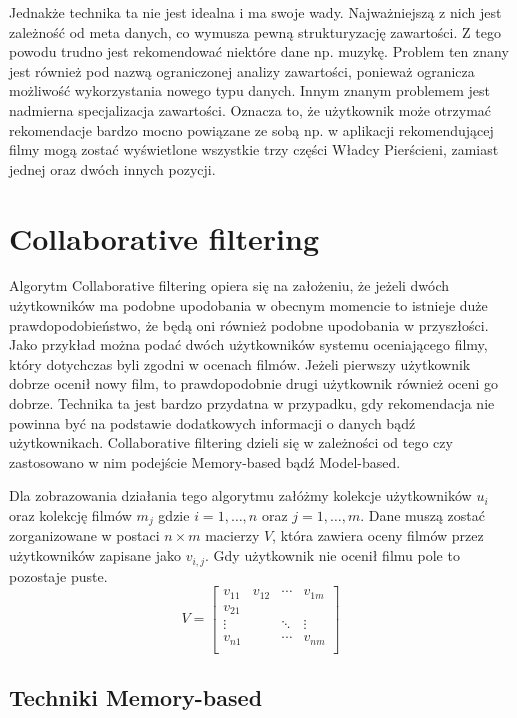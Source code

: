 Jednakże technika ta nie jest idealna i ma swoje wady. Najważniejszą z nich jest zależność od meta danych, co wymusza pewną strukturyzację zawartości. Z tego powodu trudno jest rekomendować niektóre dane np. muzykę. Problem ten znany jest również pod nazwą ograniczonej analizy zawartości, ponieważ ogranicza możliwość wykorzystania nowego typu danych. Innym znanym problemem jest nadmierna specjalizacja zawartości. Oznacza to, że użytkownik może otrzymać rekomendacje bardzo mocno powiązane ze sobą np. w aplikacji rekomendującej filmy mogą zostać wyświetlone wszystkie trzy części Władcy Pierścieni, zamiast jednej oraz dwóch innych pozycji.

\newpage

\section{Collaborative filtering}

Algorytm Collaborative filtering opiera się na założeniu, że jeżeli dwóch użytkowników ma podobne upodobania w obecnym momencie to istnieje duże prawdopodobieństwo, że będą oni również podobne upodobania w przyszłości. Jako przykład można podać dwóch użytkowników systemu oceniającego filmy, który dotychczas byli zgodni w ocenach filmów. Jeżeli pierwszy użytkownik dobrze ocenił nowy film, to prawdopodobnie drugi użytkownik również oceni go dobrze. Technika ta jest bardzo przydatna w przypadku, gdy rekomendacja nie powinna być na podstawie dodatkowych informacji o danych bądź użytkownikach. Collaborative filtering dzieli się w zależności od tego czy zastosowano w nim podejście Memory-based bądź Model-based. 

Dla zobrazowania działania tego algorytmu załóżmy kolekcje użytkowników $u_i$ oraz kolekcję filmów $m_j$ gdzie $i = 1,\dots,n$ oraz $j = 1,\dots,m$. Dane muszą zostać zorganizowane w postaci $n \times m$ macierzy $V$, która zawiera oceny filmów przez użytkowników zapisane jako $v_{i,j}$. Gdy użytkownik nie ocenił filmu pole to pozostaje puste.  
$$
V= \left[
\begin{array}{cccc}
	v_{11} & v_{12} & \cdots & v_{1m} \\
	v_{21} &   &   &   \\
	\vdots &   & \ddots  &  \vdots \\
	v_{n1} &   &  \cdots &  v_{nm}  \\
	
\end{array}
\right]
$$

\subsection{Techniki Memory-based}

